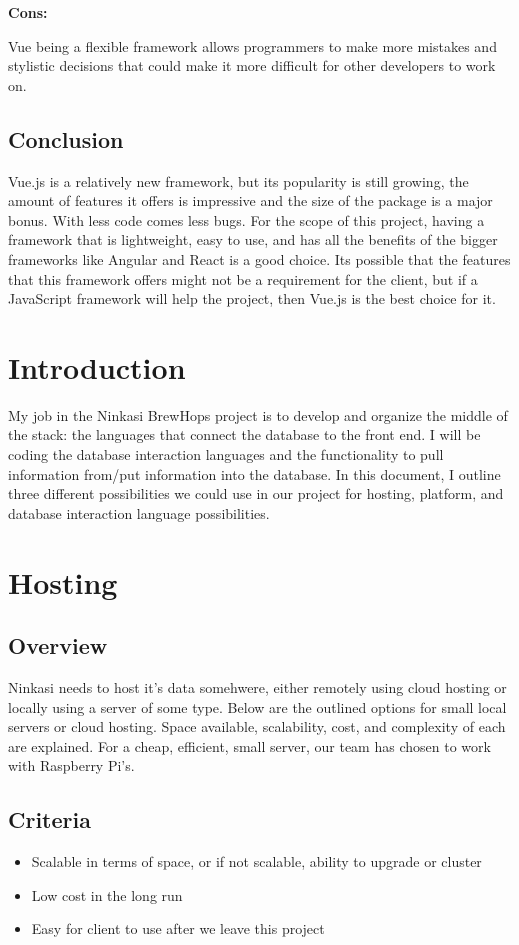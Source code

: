 \documentclass[draftclsnofoot,onecolumn,letterpaper,10pt,compsoc]{IEEEtran}
\begin{document}
    \textbf{Cons:}

    Vue being a flexible framework allows programmers to make more mistakes and stylistic decisions that could make it more difficult for other developers to work on.


  \subsection{Conclusion}
    Vue.js is a relatively new framework, but its popularity is still growing, the amount of features it offers is impressive and the size of the package is a major bonus.
    With less code comes less bugs.
    For the scope of this project, having a framework that is lightweight, easy to use, and has all the benefits of the bigger frameworks like Angular and React is a good choice.
    Its possible that the features that this framework offers might not be a requirement for the client, but if a JavaScript framework will help the project, then Vue.js is the best choice for it.

		\section{Introduction}
		My job in the Ninkasi BrewHops project is to develop and organize the middle of the stack: the languages that connect the database to the front end.
		I will be coding the database interaction languages and the functionality to pull information from/put information into the database.
		In this document, I outline three different possibilities we could use in our project for hosting, platform, and database interaction language possibilities.

		\section{Hosting}
		    \subsection{Overview}
				Ninkasi needs to host it's data somehwere, either remotely using cloud hosting or locally using a server of some type.
				Below are the outlined options for small local servers or cloud hosting.
				Space available, scalability, cost, and complexity of each are explained.
				For a cheap, efficient, small server, our team has chosen to work with Raspberry Pi's.
				\subsection{Criteria}
				\begin{itemize}
		  \item Scalable in terms of space, or if not scalable, ability to upgrade or cluster
		  \item Low cost in the long run
		  \item Easy for client to use after we leave this project
		\end{itemize}
\end{document}
